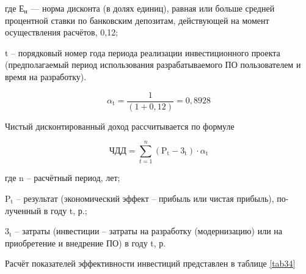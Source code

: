 где  $\text{Е}_\text{н}$  — норма дисконта (в долях единиц), равная или больше средней процентной ставки по банковским депозитам, действующей на момент осуществления расчётов, 0,12;

t – порядковый номер года периода реализации инвестиционного проекта (предполагаемый период использования разрабатываемого ПО пользователем и время на разработку).

$$
    \alpha_\text{t} = \frac {1}{(1 + 0,12)} = 0,8928
$$


Чистый дисконтированный доход рассчитывается по формуле


$$
 \text{ЧДД} = \sum_{t=1}^{n}(\text{P}_\text{t} - \text{3}_\text{t}) \cdot\alpha_\text{t}
$$

где n – расчётный период, лет;

 $ \text{P}_\text{t} $ – результат (экономический эффект – прибыль или чистая прибыль), по-лученный в году t, р.;
 
$\text{3}_\text{t}$ – затраты (инвестиции – затраты на разработку (модернизацию) или на приобретение и внедрение ПО) в году t, р.

Расчёт показателей эффективности инвестиций представлен в таблице \ref{tab34} 



